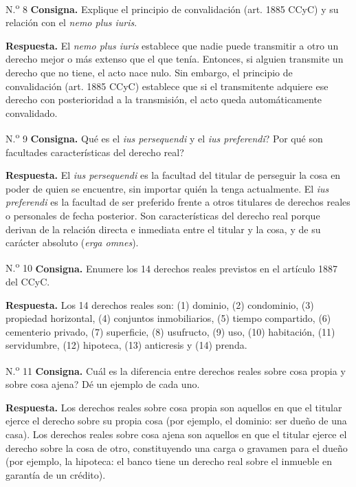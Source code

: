 \documentclass[12pt,oneside]{book}
\begin{document}
\begin{exercise}{N.\textsuperscript{o} 8}
\textbf{Consigna.} Explique el principio de convalidaci\'on (art. 1885 CCyC) y su relaci\'on con el \textit{nemo plus iuris}.

\textbf{Respuesta.} El \textit{nemo plus iuris} establece que nadie puede transmitir a otro un derecho mejor o m\'as extenso que el que ten\'ia. Entonces, si alguien transmite un derecho que no tiene, el acto nace nulo. Sin embargo, el principio de convalidaci\'on (art. 1885 CCyC) establece que si el transmitente adquiere ese derecho con posterioridad a la transmisi\'on, el acto queda autom\'aticamente convalidado.
\end{exercise}

\begin{exercise}{N.\textsuperscript{o} 9}
\textbf{Consigna.} \textquestiondown Qu\'e es el \textit{ius persequendi} y el \textit{ius preferendi}? \textquestiondown Por qu\'e son facultades caracter\'isticas del derecho real?

\textbf{Respuesta.} El \textit{ius persequendi} es la facultad del titular de perseguir la cosa en poder de quien se encuentre, sin importar qui\'en la tenga actualmente. El \textit{ius preferendi} es la facultad de ser preferido frente a otros titulares de derechos reales o personales de fecha posterior. Son caracter\'isticas del derecho real porque derivan de la relaci\'on directa e inmediata entre el titular y la cosa, y de su car\'acter absoluto (\textit{erga omnes}).
\end{exercise}

\begin{exercise}{N.\textsuperscript{o} 10}
\textbf{Consigna.} Enumere los 14 derechos reales previstos en el art\'iculo 1887 del CCyC.

\textbf{Respuesta.} Los 14 derechos reales son: (1) dominio, (2) condominio, (3) propiedad horizontal, (4) conjuntos inmobiliarios, (5) tiempo compartido, (6) cementerio privado, (7) superficie, (8) usufructo, (9) uso, (10) habitaci\'on, (11) servidumbre, (12) hipoteca, (13) anticresis y (14) prenda.
\end{exercise}

\begin{exercise}{N.\textsuperscript{o} 11}
\textbf{Consigna.} \textquestiondown Cu\'al es la diferencia entre derechos reales sobre cosa propia y sobre cosa ajena? D\'e un ejemplo de cada uno.

\textbf{Respuesta.} Los derechos reales sobre cosa propia son aquellos en que el titular ejerce el derecho sobre su propia cosa (por ejemplo, el dominio: ser due\~no de una casa). Los derechos reales sobre cosa ajena son aquellos en que el titular ejerce el derecho sobre la cosa de otro, constituyendo una carga o gravamen para el due\~no (por ejemplo, la hipoteca: el banco tiene un derecho real sobre el inmueble en garant\'ia de un cr\'edito).
\end{exercise}
\end{document}
